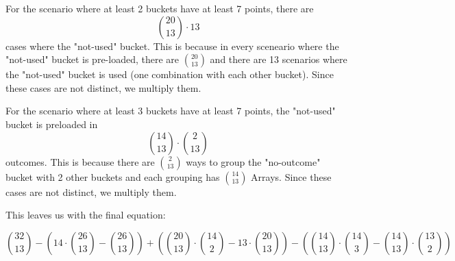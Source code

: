 \documentclass[11pt]{article}
\begin{document}
For the scenario where at least 2 buckets have at least 7 points, there are  
$$\binom{20}{13} \cdot 13$$
cases where the "not-used" bucket. This is because in every sceneario where the "not-used" bucket is pre-loaded, there are $\binom{20}{13}$ and there are 13 scenarios where the "not-used" bucket is used (one combination with each other bucket). Since these cases are not distinct, we multiply them.

For the scenario where at least 3 buckets have at least 7 points, the "not-used" bucket is preloaded in  
$$\binom{14}{13} \cdot \binom{2}{13}$$
outcomes. This is because there are $\binom{2}{13}$ ways to group the "no-outcome" bucket with 2 other buckets and each grouping has $\binom{14}{13}$ Arrays. Since these cases are not distinct, we multiply them.

This leaves us with the final equation:

$$\binom{32}{13} - (14 \cdot \binom{26}{13} - \binom{26}{13}) + (\binom{20}{13} \cdot \binom{14}{2} - 13 \cdot \binom{20}{13}) - (\binom{14}{13} \cdot \binom{14}{3} - \binom{14}{13} \cdot \binom{13}{2})$$
\end{document}

